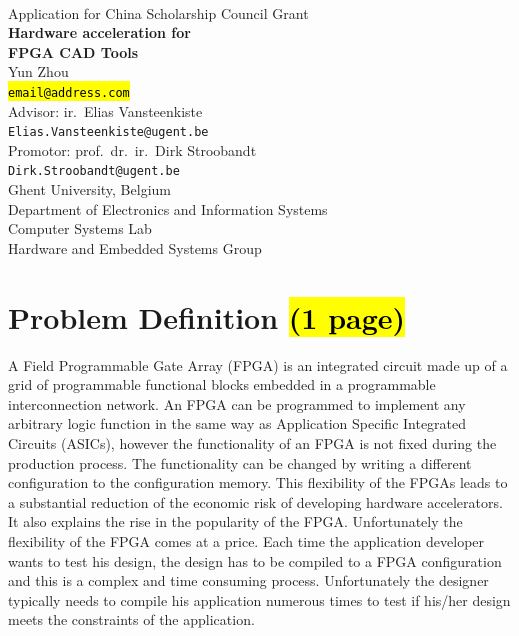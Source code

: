 \documentclass[a4paper,oneside,12pt]{article}
\begin{document}

\thispagestyle{empty}

\begin{center}
\mbox{}\\\vspace{5mm}
{\Large Application for China Scholarship Council Grant}\\ [45mm]
%
{\bf\Huge Hardware acceleration for\\
[3mm] FPGA CAD Tools} \\
\vspace{45mm}
\Large Yun Zhou \\
\vspace{2mm}
\small\texttt{\hl{email@address.com}} \\
\vspace{20mm}
\Large Advisor: ir.\ Elias Vansteenkiste \\
\small\texttt{Elias.Vansteenkiste@ugent.be} \\
\vspace{2mm}
\Large Promotor: prof.\ dr.\ ir.\ Dirk Stroobandt \\
\small\texttt{Dirk.Stroobandt@ugent.be} \\
\vspace{20mm}
\normalsize Ghent University, Belgium \\
\normalsize Department of Electronics and Information Systems\\
\normalsize Computer Systems Lab\\
\normalsize Hardware and Embedded Systems Group 
\end{center}

\newpage

\tableofcontents

\clearpage

\section{Problem Definition \hl{(1 page)}}
A Field Programmable Gate Array (FPGA) is an integrated circuit made up of a grid of programmable functional blocks embedded in a programmable interconnection network. An FPGA can be programmed to implement any arbitrary logic function in the same way as Application Specific Integrated Circuits (ASICs), however the functionality of an FPGA is not fixed during the production process. The functionality can be changed by writing a different configuration to the configuration memory. This flexibility of the FPGAs leads to a substantial reduction of the economic risk of developing hardware accelerators. It also explains the rise in the popularity of the FPGA. Unfortunately the flexibility of the FPGA comes at a price.  Each time the application developer wants to test his design, the design has to be compiled to a FPGA configuration and this is a complex and time consuming process. Unfortunately the designer typically needs to compile his application numerous times to test if his/her design meets the constraints of the application. 
\end{document}
